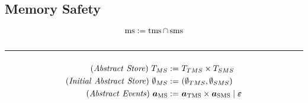\documentclass[utf8,acmsmall,review,screen,dvipsnames]{acmart}
\begin{document}
\subsection{Memory Safety}\label{ap:subsec:ms}

\begin{definition}[\glsfirst*{ms}]\label{ap:def:trace:msdef}
  \begin{displaymath}
    \operatorname{ms}:=\operatorname{tms} \cap \operatorname{sms}
  \end{displaymath}
\end{definition}
$$\;$$
\hrule
$$\;$$
\begin{gather*}
  \begin{aligned}
    \mi{(Abstract\ Store)}~\msmonitor:=&\ \tmsmonitor\times\smsmonitor\\
    \mi{(Initial\ Abstract\ Store)}~\emptymsmon:=&\ (\emptytmsmon, \emptysmsmon) \\
    \mi{(Abstract\ Events)}~\msevent:=&\ \tmsevent\times\smsevent \mid \absev{\emptyevent}\\
  \end{aligned}
\end{gather*}
\begin{center}
  $\;$\\
\end{center}
\begin{center}
  $\;$\\
\end{center}
\end{document}
